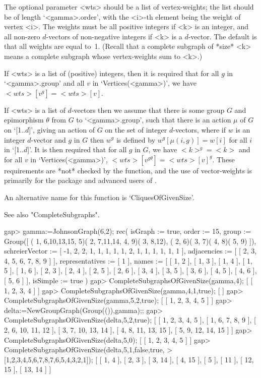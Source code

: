 The optional parameter <wts> should be a list of vertex-weights; the list
should be of length `<gamma>.order', with the <i>-th element being the
weight of vertex <i>. The weights must be all positive integers if <k>
is an integer, and all non-zero $d$-vectors of non-negative integers
if <k> is a $d$-vector. The default is that all weights are equal to~1.
(Recall that a complete subgraph of *size* <k> means a complete subgraph
whose vertex-weights sum to <k>.)

If <wts> is a list of (positive) integers, then it is required that
for all $g$ in `<gamma>.group' and all $v$ in `Vertices(<gamma>)',
we have $<wts>[v^g]=<wts>[v]$.

If <wts> is a list of $d$-vectors then we assume that there is some group
$G$ and epimorphism $\theta$ from $G$ to `<gamma>.group', such that there
is an action $\mu$ of $G$ on `[1..$d$]', giving an action of $G$ on the
set of integer $d$-vectors, where if $w$ is an integer $d$-vector and
$g$ in $G$ then $w^g$ is defined by $w^g[\mu(i,g)]=w[i]$ for all $i$
in `[1..$d$]'. It is then required that for all $g$ in $G$, we have
$<k>^g=<k>$ and for all $v$ in `Vertices(<gamma>)', $<wts>[v^{g\theta}]
= <wts>[v]^g$.  These requirements are *not* checked by the function,
and the use of vector-weights is primarily for the {\DESIGN} package
and advanced users of {\GRAPE}.

An alternative name for this function is 
`CliquesOfGivenSize'.

See also "CompleteSubgraphs".

\beginexample
gap> gamma:=JohnsonGraph(6,2);                         
rec( isGraph := true, order := 15, 
  group := Group([ ( 1, 6,10,13,15, 5)( 2, 7,11,14, 4, 9)( 3, 8,12), 
      ( 2, 6)( 3, 7)( 4, 8)( 5, 9) ]), 
  schreierVector := [ -1, 2, 2, 1, 1, 1, 1, 1, 2, 1, 1, 1, 1, 1, 1 ], 
  adjacencies := [ [ 2, 3, 4, 5, 6, 7, 8, 9 ] ], representatives := [ 1 ], 
  names := [ [ 1, 2 ], [ 1, 3 ], [ 1, 4 ], [ 1, 5 ], [ 1, 6 ], [ 2, 3 ], 
      [ 2, 4 ], [ 2, 5 ], [ 2, 6 ], [ 3, 4 ], [ 3, 5 ], [ 3, 6 ], [ 4, 5 ], 
      [ 4, 6 ], [ 5, 6 ] ], isSimple := true )
gap> CompleteSubgraphsOfGivenSize(gamma,4);
[ [ 1, 2, 3, 4 ] ]
gap> CompleteSubgraphsOfGivenSize(gamma,4,1,true);
[  ]
gap> CompleteSubgraphsOfGivenSize(gamma,5,2,true);
[ [ 1, 2, 3, 4, 5 ] ]
gap> delta:=NewGroupGraph(Group(()),gamma);;
gap> CompleteSubgraphsOfGivenSize(delta,5,2,true);
[ [ 1, 2, 3, 4, 5 ], [ 1, 6, 7, 8, 9 ], [ 2, 6, 10, 11, 12 ], 
  [ 3, 7, 10, 13, 14 ], [ 4, 8, 11, 13, 15 ], [ 5, 9, 12, 14, 15 ] ]
gap> CompleteSubgraphsOfGivenSize(delta,5,0);
[ [ 1, 2, 3, 4, 5 ] ]
gap> CompleteSubgraphsOfGivenSize(delta,5,1,false,true,
>       [1,2,3,4,5,6,7,8,7,6,5,4,3,2,1]);
[ [ 1, 4 ], [ 2, 3 ], [ 3, 14 ], [ 4, 15 ], [ 5 ], [ 11 ], [ 12, 15 ], 
  [ 13, 14 ] ]
\endexample

